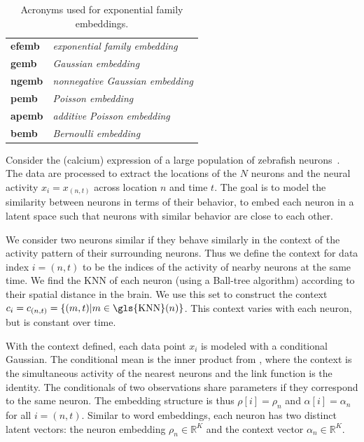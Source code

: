 \documentclass[12pt]{article}
\begin{document}
%
\begin{table}[h!]
  \begin{center}
    \begin{tabular}{ll}
      {\bf \gls{efemb}} & {\it exponential family embedding} \\
      {\bf \gls{gemb}} & {\it Gaussian embedding} \\
      {\bf \gls{ngemb}} & {\it nonnegative Gaussian embedding} \\
      {\bf \gls{pemb}} & {\it Poisson embedding} \\
      {\bf \gls{apemb}} & {\it additive Poisson embedding}\\
      {\bf \gls{bemb}} & {\it Bernoulli embedding}
    \end{tabular}
  \end{center}
  \caption{Acronyms used for exponential family embeddings.}
  \label{tab:acronyms}
\end{table}
\vspace{-7pt}
%
 Consider
the (calcium) expression of a large population of zebrafish
neurons~\citep{ahrens2013whole}. The data are processed to extract the
locations of the $N$ neurons and the neural activity $x_i = x_{(n,t)}$
across location $n$ and time $t$. The goal is to model the similarity
between neurons in terms of their behavior, to embed each neuron in a
latent space such that neurons with similar behavior are close to each
other.

We consider two neurons similar if they behave similarly in the
context of the activity pattern of their surrounding neurons. Thus we
define the context for data index $i =(n,t)$ to be the indices of the
activity of nearby neurons at the same time. We find the \gls{KNN} of
each neuron (using a Ball-tree algorithm) according to their spatial
distance in the brain. We use this set to construct the context
$c_i = c_{(n,t)}=\{(m,t) | m \in \text{\gls{KNN}}(n) \}$.  This
context varies with each neuron, but is constant over time.

With the context defined, each data point $x_i$ is modeled with a
conditional Gaussian. The conditional mean is the inner product from
, where the context is the simultaneous
activity of the nearest neurons and the link function is the identity.
The conditionals of two observations share parameters if they
correspond to the same neuron.  The embedding structure is thus
$\rho[i] = \rho_n$ and $\alpha[i] =\alpha_n$ for all
$i=(n,t)$. Similar to word embeddings, each neuron has two distinct
latent vectors: the neuron embedding $\rho_n\in\mathbb{R}^K$ and the
context vector $\alpha_n\in\mathbb{R}^K$.
\end{document}
